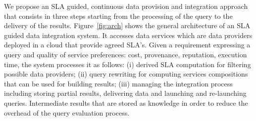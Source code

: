We propose an SLA guided, continuous data provision and integration approach that consists in three steps  starting from the processing of the query  to the delivery of the results.
Figure~\ref{fig:arch} shows the general architecture of an SLA guided data integration system. It accesses data services which are data providers deployed in a cloud  that provide agreed SLA's. 
Given a requirement expressing a query and quality of service preferences: cost, provenance, reputation, execution time, the system processes it  as follows: (i) derived SLA  computation for filtering possible data providers; (ii) query rewriting for computing services compositions that can be used for building results; (iii) managing the integration process including storing partial results, delivering data and launching and re-launching queries. Intermediate results that are stored as knowledge in order to reduce the overhead of the query evaluation process. 


\begin{figure}
\end{figure}

